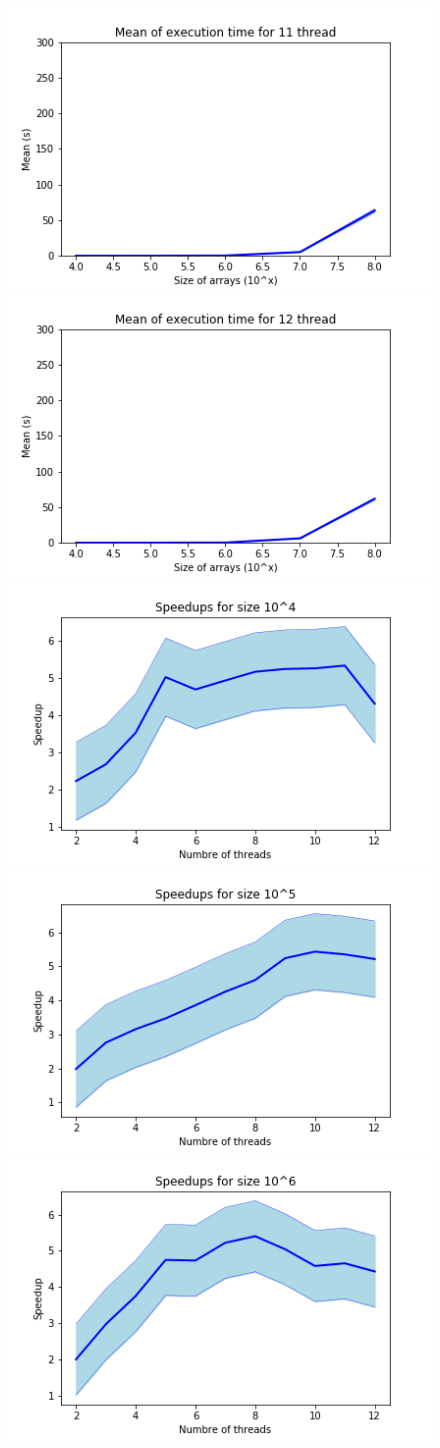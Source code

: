 \documentclass[a4paper,12pt]{article}
\begin{document}
    \begin{figure}
    
        \centering
        \includegraphics[width = 0.45\linewidth]{Mean of execution time for 11 thread.png}
        \includegraphics[width = 0.45\linewidth]{Mean of execution time for 12 thread.png}
        \includegraphics[width = 0.45\linewidth]{Speedups for size 10^4.png}
        \includegraphics[width = 0.45\linewidth]{Speedups for size 10^5.png}
        \includegraphics[width = 0.45\linewidth]{Speedups for size 10^6.png}

\end{figure}
\end{document}
